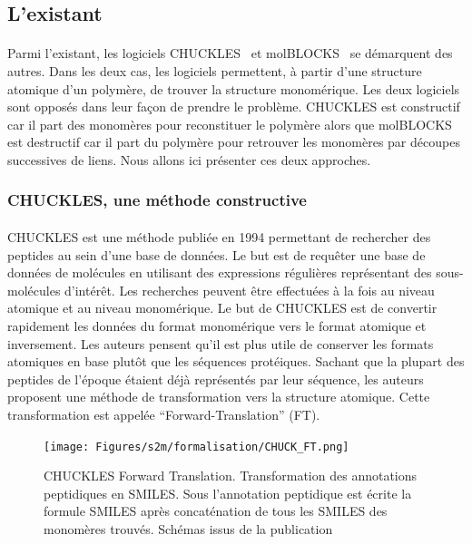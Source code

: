 \documentclass[12pt,french,twoside]{report}
\begin{document}
\subsection{L'existant}

\paragraph{}Parmi l'existant, les logiciels CHUCKLES~\cite{siani_chuckles:_1994} et molBLOCKS~\cite{ghersi_molblocks:_2014} se démarquent des autres.
Dans les deux cas, les logiciels permettent, à partir d'une structure atomique d'un polymère, de trouver la structure monomérique.
Les deux logiciels sont opposés dans leur façon de prendre le problème.
CHUCKLES est constructif car il part des monomères pour reconstituer le polymère alors que molBLOCKS est destructif car il part du polymère pour retrouver les monomères par découpes successives de liens.
Nous allons ici présenter ces deux approches.


\subsubsection{CHUCKLES, une méthode constructive}

\paragraph{}CHUCKLES est une méthode publiée en 1994 permettant de rechercher des peptides au sein d'une base de données.
Le but est de requêter une base de données de molécules en utilisant des expressions régulières représentant des sous-molécules d'intérêt.
Les recherches peuvent être effectuées à la fois au niveau atomique et au niveau monomérique.
Le but de CHUCKLES est de convertir rapidement les données du format monomérique vers le format atomique et inversement.
Les auteurs pensent qu'il est plus utile de conserver les formats atomiques en base plutôt que les séquences protéiques.
Sachant que la plupart des peptides de l'époque étaient déjà représentés par leur séquence, les auteurs proposent une méthode de transformation vers la structure atomique.
Cette transformation est appelée ``Forward-Translation'' (FT).

\begin{figure}[!ht]
  \begin{center}
    \texttt{[image: Figures/s2m/formalisation/CHUCK\_FT.png]}
    \caption{\label{chuck_ft}CHUCKLES Forward Translation.
    Transformation des annotations peptidiques en SMILES.
    Sous l'annotation peptidique est écrite la formule SMILES après concaténation de tous les SMILES des monomères trouvés.
    Schémas issus de la publication}
  \end{center}
\end{figure}
\end{document}
